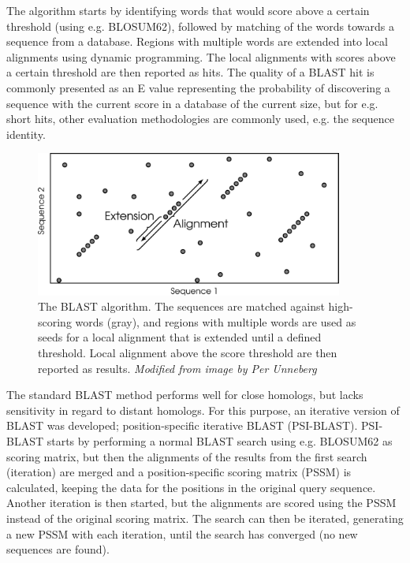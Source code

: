 \documentclass[a4paper, twoside, 12pt, openright]{report}
\begin{document}
The algorithm starts by identifying words that would score above a certain threshold (using e.g. BLOSUM62), followed by matching of the words towards a sequence from a database. Regions with multiple words are extended into local alignments using dynamic programming. The local alignments with scores above a certain threshold are then reported as hits. The quality of a BLAST hit is commonly presented as an E value representing the probability of discovering a sequence with the current score in a database of the current size, but for e.g. short hits, other evaluation methodologies are commonly used, e.g. the sequence identity. 

\begin{figure}[htbp]
 \includegraphics[width=0.9\textwidth]{fig/blast_method.pdf}
 \caption{The BLAST algorithm. The sequences are matched against high-scoring words (gray), and regions with multiple words are used as seeds for a local alignment that is extended until a defined threshold. Local alignment above the score threshold are then reported as results. {\em Modified from image by Per Unneberg}}
 \label{fig:blast_procedure}
\end{figure}

The standard BLAST method performs well for close homologs, but lacks sensitivity in regard to distant homologs. For this purpose, an iterative version of BLAST was developed; position-specific iterative BLAST (PSI-BLAST)\cite{altschul_gapped_1997}.  PSI-BLAST starts by performing a normal BLAST search using e.g. BLOSUM62 as scoring matrix, but then the alignments of the results from the first search (iteration) are merged and a position-specific scoring matrix (PSSM)  is calculated, keeping the data for the positions in the original query sequence. Another iteration is then started, but the alignments are scored using the PSSM instead of the original scoring matrix. The search can then be iterated, generating a new PSSM with each iteration, until the search has converged (no new sequences are found).
\end{document}
